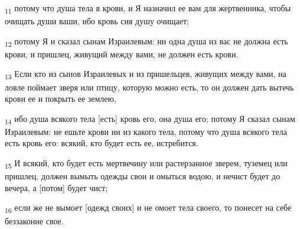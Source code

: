 \begin{tcolorbox}
\textsubscript{11} потому что душа тела в крови, и Я назначил ее вам для жертвенника, чтобы очищать души ваши, ибо кровь сия душу очищает;
\end{tcolorbox}
\begin{tcolorbox}
\textsubscript{12} потому Я и сказал сынам Израилевым: ни одна душа из вас не должна есть крови, и пришлец, живущий между вами, не должен есть крови.
\end{tcolorbox}
\begin{tcolorbox}
\textsubscript{13} Если кто из сынов Израилевых и из пришельцев, живущих между вами, на ловле поймает зверя или птицу, которую можно есть, то он должен дать вытечь крови ее и покрыть ее землею,
\end{tcolorbox}
\begin{tcolorbox}
\textsubscript{14} ибо душа всякого тела [есть] кровь его, она душа его; потому Я сказал сынам Израилевым: не ешьте крови ни из какого тела, потому что душа всякого тела есть кровь его: всякий, кто будет есть ее, истребится.
\end{tcolorbox}
\begin{tcolorbox}
\textsubscript{15} И всякий, кто будет есть мертвечину или растерзанное зверем, туземец или пришлец, должен вымыть одежды свои и омыться водою, и нечист будет до вечера, а [потом] будет чист;
\end{tcolorbox}
\begin{tcolorbox}
\textsubscript{16} если же не вымоет [одежд своих] и не омоет тела своего, то понесет на себе беззаконие свое.
\end{tcolorbox}
